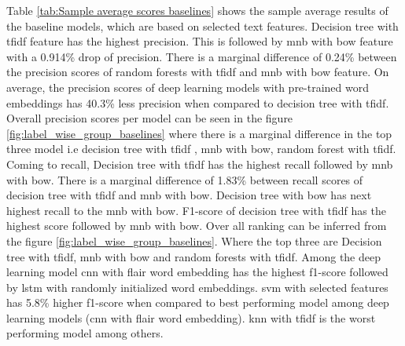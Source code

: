 Table \ref{tab:Sample average scores baselines} shows the sample average results of the baseline models, which are based on selected text features. Decision tree with \acrfull{tfidf} feature has the highest precision. This is followed by \acrfull{mnb} with \acrfull{bow} feature with a 0.914\% drop of precision. There is a marginal difference of 0.24\% between the precision scores of random forests with \acrfull{tfidf} and \acrfull{mnb} with \acrfull{bow} feature. On average, the precision scores of deep learning models with pre-trained word embeddings has 40.3\% less precision when compared to decision tree with \acrshort{tfidf}. Overall precision scores per model can be seen in the figure \ref{fig:label_wise_group_baselines} where there is a marginal difference in the top three model i.e decision tree with \acrfull{tfidf} , \acrfull{mnb} with  \acrfull{bow}, random forest with \acrfull{tfidf}. Coming to recall, Decision tree with \acrshort{tfidf} has the highest recall followed by  \acrfull{mnb} with \acrfull{bow}. There is a marginal difference of 1.83\% between recall scores of decision tree with \acrshort{tfidf} and \acrfull{mnb} with \acrfull{bow}. Decision tree with \acrfull{bow} has next highest recall to the \acrfull{mnb} with \acrfull{bow}. F1-score of decision tree with \acrshort{tfidf} has the highest score followed by \acrfull{mnb} with \acrfull{bow}. Over all ranking can be inferred from the figure \ref{fig:label_wise_group_baselines}. Where the top three are Decision tree with \acrshort{tfidf}, \acrshort{mnb} with \acrshort{bow} and random forests with \acrshort{tfidf}. Among the deep learning model \acrshort{cnn} with flair word embedding has the highest f1-score followed by \acrfull{lstm} with randomly initialized word embeddings. \acrfull{svm} with selected features has 5.8\% higher f1-score when compared to best performing model among deep learning models (\acrshort{cnn} with flair word embedding). \acrshort{knn} with \acrshort{tfidf} is the worst performing model among others.

